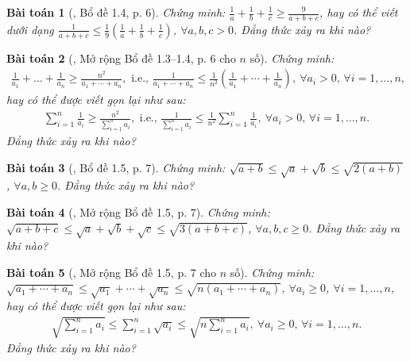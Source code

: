 \documentclass{article}
\newtheorem{baitoan}{Bài toán}
\begin{document}
\begin{baitoan}[\cite{Son_Nghiep_Trung_Can2021}, Bổ đề 1.4, p. 6]
	Chứng minh: $\frac{1}{a} + \frac{1}{b} + \frac{1}{c}\ge\frac{9}{a + b + c}$, hay có thể viết dưới dạng $\frac{1}{a + b + c}\le\frac{1}{9}\left(\frac{1}{a} + \frac{1}{b} + \frac{1}{c}\right)$, $\forall a,b,c > 0$. Đẳng thức xảy ra khi nào?
\end{baitoan}

\begin{baitoan}[\cite{Son_Nghiep_Trung_Can2021}, Mở rộng Bổ đề 1.3--1.4, p. 6 cho $n$ số]
	Chứng minh:
	\begin{align*}
		\frac{1}{a_1} + \ldots + \frac{1}{a_n}\ge\frac{n^2}{a_1 + \cdots + a_n},\mbox{ i.e., }\frac{1}{a_1 + \cdots + a_n}\le\frac{1}{n^2}\left(\frac{1}{a_1} + \cdots + \frac{1}{a_n}\right),\ \forall a_i > 0,\,\forall i = 1,\ldots,n,
	\end{align*}
	hay có thể được viết gọn lại như sau:
	\begin{align*}
		\sum_{i=1}^{n} \frac{1}{a_i}\ge\frac{n^2}{\sum_{i=1}^n a_i},\mbox{ i.e., }\frac{1}{\sum_{i=1}^n a_i}\le\frac{1}{n^2}\sum_{i=1}^n \frac{1}{a_i},\ \forall a_i > 0,\,\forall i = 1,\ldots,n.
	\end{align*}
	Đẳng thức xảy ra khi nào?
\end{baitoan}

\begin{baitoan}[\cite{Son_Nghiep_Trung_Can2021}, Bổ đề 1.5, p. 7]
	Chứng minh: $\sqrt{a + b}\le\sqrt{a} + \sqrt{b}\le\sqrt{2(a + b)}$, $\forall a,b\ge 0$. Đẳng thức xảy ra khi nào?
\end{baitoan}

\begin{baitoan}[\cite{Son_Nghiep_Trung_Can2021}, Mở rộng Bổ đề 1.5, p. 7]
	Chứng minh: $\sqrt{a + b + c}\le\sqrt{a} + \sqrt{b} + \sqrt{c}\le\sqrt{3(a + b + c)}$, $\forall a,b,c\ge 0$. Đẳng thức xảy ra khi nào?
\end{baitoan}

\begin{baitoan}[\cite{Son_Nghiep_Trung_Can2021}, Mở rộng Bổ đề 1.5, p. 7 cho $n$ số]
	Chứng minh: $\sqrt{a_1 + \cdots + a_n}\le\sqrt{a_1} + \cdots + \sqrt{a_n}\le\sqrt{n(a_1 + \cdots + a_n)}$, $\forall a_i\ge 0$, $\forall i = 1,\ldots,n$, hay có thể được viết gọn lại như sau:
	\begin{align*}
		\sqrt{\sum_{i=1}^n a_i}\le\sum_{i=1}^n \sqrt{a_i}\le\sqrt{n\sum_{i=1}^n a_i},\ \forall a_i\ge 0,\,\forall i = 1,\ldots,n.
	\end{align*}
	Đẳng thức xảy ra khi nào?
\end{baitoan}
\end{document}
